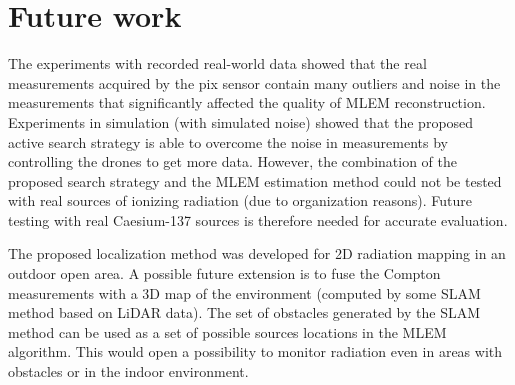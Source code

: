 \section{Future work}
The experiments with recorded real-world data showed that the real measurements acquired by the \ac{pix} sensor contain many outliers and noise in the measurements that significantly affected the quality of \ac{MLEM} reconstruction.
Experiments in simulation (with simulated noise) showed that the proposed active search strategy is able to overcome the noise in measurements by controlling the drones to get more data.
However, the combination of the proposed search strategy and the \ac{MLEM} estimation method could not be tested with real sources of ionizing radiation (due to organization reasons).
Future testing with real Caesium-137 sources is therefore needed for accurate evaluation.

The proposed localization method was developed for 2D radiation mapping in an outdoor open area.
A possible future extension is to fuse the Compton measurements with a 3D map of the environment (computed by some \ac{SLAM} method based on \ac{LiDAR} data).
The set of obstacles generated by the \ac{SLAM} method can be used as a set of possible sources locations in the \ac{MLEM} algorithm.
This would open a possibility to monitor radiation even in areas with obstacles or in the indoor environment.












